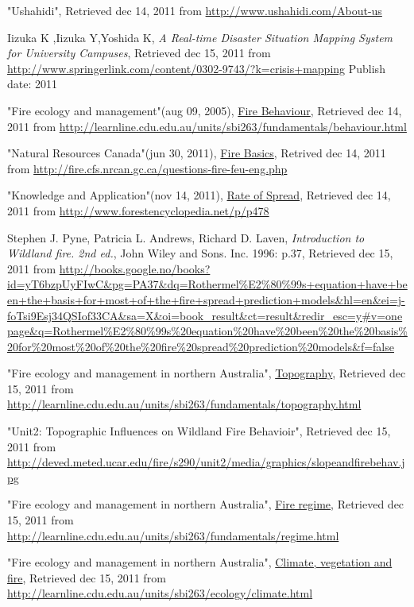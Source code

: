 \begin{thebibliography}{4}
 "Ushahidi", Retrieved dec 14, 2011 from \url{http://www.ushahidi.com/About-us}

 Iizuka K ,Iizuka Y,Yoshida K, \emph{A Real-time Disaster Situation Mapping System for University Campuses}, Retrieved dec 15, 2011 from \url{http://www.springerlink.com/content/0302-9743/?k=crisis+mapping} Publish date: 2011

 "Fire ecology and management"(aug 09, 2005), \underline{Fire Behaviour}, Retrieved dec 14, 2011 from \url{http://learnline.cdu.edu.au/units/sbi263/fundamentals/behaviour.html}

 "Natural Resources Canada"(jun 30, 2011), \underline{Fire Basics}, Retrived dec 14, 2011 from \url{http://fire.cfs.nrcan.gc.ca/questions-fire-feu-eng.php}

 "Knowledge and Application"(nov 14, 2011), \underline{Rate of Spread}, Retrieved dec 14, 2011 from \url{http://www.forestencyclopedia.net/p/p478}

 Stephen J. Pyne, Patricia L. Andrews, Richard D. Laven, \emph{Introduction to Wildland fire. 2nd ed.}, John Wiley and Sons. Inc. 1996: p.37, Retrieved dec 15, 2011 from
\url{http://books.google.no/books?id=yT6bzpUyFIwC&pg=PA37&dq=Rothermel%E2%80%99s+equation+have+been+the+basis+for+most+of+the+fire+spread+prediction+models&hl=en&ei=j-foTsi9Esj34QSIof33CA&sa=X&oi=book_result&ct=result&redir_esc=y#v=onepage&q=Rothermel%E2%80%99s%20equation%20have%20been%20the%20basis%20for%20most%20of%20the%20fire%20spread%20prediction%20models&f=false}

 "Fire ecology and management in northern Australia", \underline{Topography}, Retrieved dec 15, 2011 from \url{http://learnline.cdu.edu.au/units/sbi263/fundamentals/topography.html}

 "Unit2: Topographic Influences on Wildland Fire Behavioir", Retrieved dec 15, 2011 from \url{http://deved.meted.ucar.edu/fire/s290/unit2/media/graphics/slopeandfirebehav.jpg}

 "Fire ecology and management in northern Australia", \underline{Fire regime}, Retrieved dec 15, 2011 from \url{http://learnline.cdu.edu.au/units/sbi263/fundamentals/regime.html}

 "Fire ecology and management in northern Australia", \underline{Climate, vegetation and fire}, Retrieved dec 15, 2011 from \url{http://learnline.cdu.edu.au/units/sbi263/ecology/climate.html}


\end{thebibliography}
